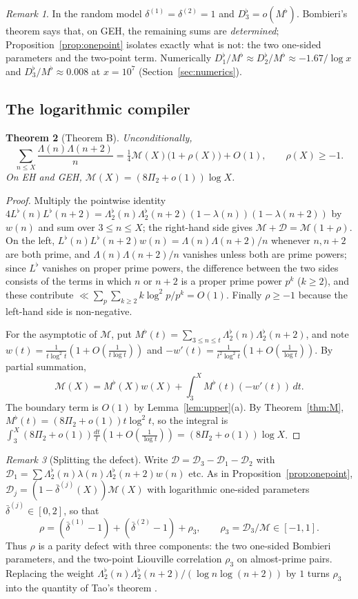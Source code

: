\documentclass[11pt]{amsart}
\newtheorem{theorem}{Theorem}[section]
\theoremstyle{definition}
\theoremstyle{remark}
\newtheorem{remark}[theorem]{Remark}
\newcommand{\Lflat}{\Lambda_2^{\flat}}
\begin{document}
\begin{remark}
In the random model $\delta^{(1)}=\delta^{(2)}=1$ and $D_3^\flat=o(M^\flat)$. Bombieri's theorem says that, on GEH, the remaining sums are \emph{determined}; Proposition~\ref{prop:onepoint} isolates exactly what is not: the two one-sided parameters and the two-point term. Numerically $D_1^\flat/M^\flat\approx D_2^\flat/M^\flat\approx-1.67/\log x$ and $D_3^\flat/M^\flat\approx0.008$ at $x=10^7$ (Section~\ref{sec:numerics}).
\end{remark}

\subsection{The logarithmic compiler}
\begin{theorem}[Theorem B]\label{thm:A}
Unconditionally,
\[
\sum_{n\le X}\frac{\Lambda(n)\Lambda(n+2)}{n}=\tfrac14\mathcal M(X)\bigl(1+\rho(X)\bigr)+O(1),\qquad\rho(X)\ge-1 .
\]
On EH and GEH, $\mathcal M(X)=(8\Pi_2+o(1))\log X$.
\end{theorem}
\begin{proof}
Multiply the pointwise identity $4L^\flat(n)L^\flat(n+2)=\Lflat(n)\Lflat(n+2)(1-\lambda(n))(1-\lambda(n+2))$ by $w(n)$ and sum over $3\le n\le X$; the right-hand side gives $\mathcal M+\mathcal D=\mathcal M(1+\rho)$. On the left, $L^\flat(n)L^\flat(n+2)w(n)=\Lambda(n)\Lambda(n+2)/n$ whenever $n,n+2$ are both prime, and $\Lambda(n)\Lambda(n+2)/n$ vanishes unless both are prime powers; since $L^\flat$ vanishes on proper prime powers, the difference between the two sides consists of the terms in which $n$ or $n+2$ is a proper prime power $p^k$ ($k\ge2$), and these contribute $\ll\sum_p\sum_{k\ge2}k\log^2p/p^k=O(1)$. Finally $\rho\ge-1$ because the left-hand side is non-negative.

For the asymptotic of $\mathcal M$, put $M^\flat(t)=\sum_{3\le n\le t}\Lflat(n)\Lflat(n+2)$, and note $w(t)=\frac{1}{t\log^2t}(1+O(\frac1{t\log t}))$ and $-w'(t)=\frac{1}{t^2\log^2t}(1+O(\frac1{\log t}))$. By partial summation,
\[
\mathcal M(X)=M^\flat(X)w(X)+\int_3^XM^\flat(t)(-w'(t))\,dt .
\]
The boundary term is $O(1)$ by Lemma~\ref{lem:upper}(a). By Theorem~\ref{thm:M}, $M^\flat(t)=(8\Pi_2+o(1))t\log^2t$, so the integral is $\int_3^X(8\Pi_2+o(1))\frac{dt}{t}(1+O(\frac1{\log t}))=(8\Pi_2+o(1))\log X$.
\end{proof}

\begin{remark}[Splitting the defect]\label{rem:split}
Write $\mathcal D=\mathcal D_3-\mathcal D_1-\mathcal D_2$ with $\mathcal D_1=\sum\Lflat(n)\lambda(n)\Lflat(n+2)w(n)$ etc. As in Proposition~\ref{prop:onepoint}, $\mathcal D_j=(1-\bar\delta^{(j)}(X))\mathcal M(X)$ with logarithmic one-sided parameters $\bar\delta^{(j)}\in[0,2]$, so that
\[
\rho=(\bar\delta^{(1)}-1)+(\bar\delta^{(2)}-1)+\rho_3,\qquad\rho_3=\mathcal D_3/\mathcal M\in[-1,1].
\]
Thus $\rho$ is a parity defect with three components: the two one-sided Bombieri parameters, and the two-point Liouville correlation $\rho_3$ on almost-prime pairs. Replacing the weight $\Lflat(n)\Lflat(n+2)/(\log n\log(n+2))$ by $1$ turns $\rho_3$ into the quantity of Tao's theorem \cite{Tao16}.
\end{remark}
\end{document}
